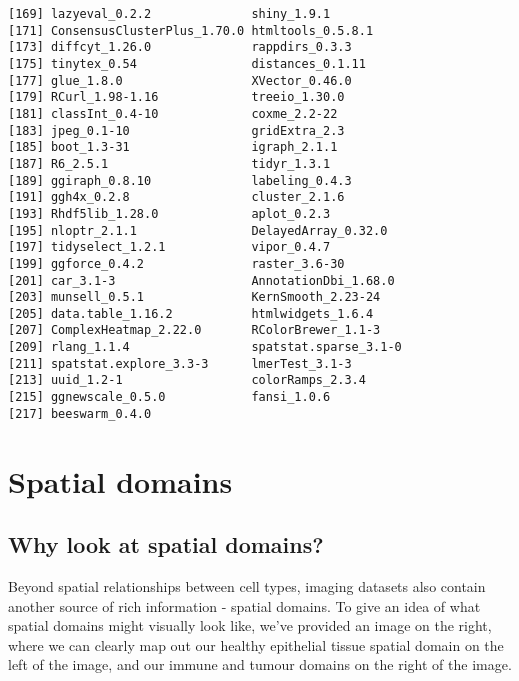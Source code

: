 \documentclass[
  letterpaper,
  DIV=11,
  numbers=noendperiod]{scrreprt}
\begin{document}
\begin{verbatim}
[169] lazyeval_0.2.2              shiny_1.9.1                
[171] ConsensusClusterPlus_1.70.0 htmltools_0.5.8.1          
[173] diffcyt_1.26.0              rappdirs_0.3.3             
[175] tinytex_0.54                distances_0.1.11           
[177] glue_1.8.0                  XVector_0.46.0             
[179] RCurl_1.98-1.16             treeio_1.30.0              
[181] classInt_0.4-10             coxme_2.2-22               
[183] jpeg_0.1-10                 gridExtra_2.3              
[185] boot_1.3-31                 igraph_2.1.1               
[187] R6_2.5.1                    tidyr_1.3.1                
[189] ggiraph_0.8.10              labeling_0.4.3             
[191] ggh4x_0.2.8                 cluster_2.1.6              
[193] Rhdf5lib_1.28.0             aplot_0.2.3                
[195] nloptr_2.1.1                DelayedArray_0.32.0        
[197] tidyselect_1.2.1            vipor_0.4.7                
[199] ggforce_0.4.2               raster_3.6-30              
[201] car_3.1-3                   AnnotationDbi_1.68.0       
[203] munsell_0.5.1               KernSmooth_2.23-24         
[205] data.table_1.16.2           htmlwidgets_1.6.4          
[207] ComplexHeatmap_2.22.0       RColorBrewer_1.1-3         
[209] rlang_1.1.4                 spatstat.sparse_3.1-0      
[211] spatstat.explore_3.3-3      lmerTest_3.1-3             
[213] uuid_1.2-1                  colorRamps_2.3.4           
[215] ggnewscale_0.5.0            fansi_1.0.6                
[217] beeswarm_0.4.0             
\end{verbatim}


\chapter{Spatial domains}\label{spatial-domains}

\section{Why look at spatial
domains?}\label{why-look-at-spatial-domains}

Beyond spatial relationships between cell types, imaging datasets also
contain another source of rich information - spatial domains. To give an
idea of what spatial domains might visually look like, we've provided an
image on the right, where we can clearly map out our healthy epithelial
tissue spatial domain on the left of the image, and our immune and
tumour domains on the right of the image.
\end{document}
